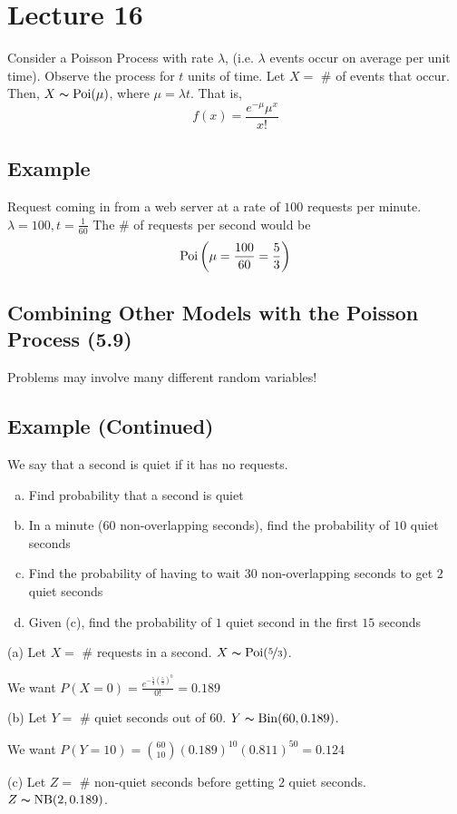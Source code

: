 \section{Lecture 16}
Consider a Poisson Process with rate $ \lambda $, (i.e. $ \lambda $ events
occur on average per unit time). Observe the process for $ t $ units of time.
Let $ X= $ \# of events that occur. Then, $ X \thicksim \operatorname{Poi}(\mu) $, where
$ \mu=\lambda t $. That is,
\[ f(x)=\frac{e^{-\mu}\mu^x}{x!} \]

\subsection{Example}
Request coming in from a web server at a rate of $ 100 $ requests per minute.
$ \lambda = 100, t=\frac{1}{60} $
The \# of requests per second would be
\[ \operatorname{Poi}\left(\mu=\frac{100}{60}=\frac{5}{3}\right) \]

\subsection{Combining Other Models with the Poisson Process (5.9)}
Problems may involve many different random variables!

\subsection{Example (Continued)}
We say that a second is quiet if it has no requests.
\begin{enumerate}[(a)]
    \item Find probability that a second is quiet
    \item In a minute ($60$ non-overlapping seconds), find the probability of $10$ quiet seconds
    \item Find the probability of having to wait $ 30 $ non-overlapping seconds to get $ 2 $ quiet seconds
    \item Given (c), find the probability of $ 1 $ quiet second in the first $ 15 $ seconds
\end{enumerate}
(a) Let $ X= $ \# requests in a second. $ X \thicksim \operatorname{Poi}(\nicefrac{5}{3}) $.

We want $ P(X=0)=\frac{e^{-\frac{5}{3}(\frac{5}{3})^0}}{0!}=0.189 $


(b) Let $ Y= $ \# quiet seconds out of 60. $ Y \thicksim \operatorname{Bin}(60,0.189) $.

We want $ P(Y=10)=\binom{60}{10}(0.189)^{10}(0.811)^{50}=0.124 $

(c) Let $ Z= $ \# non-quiet seconds before getting $ 2 $ quiet seconds. 
$ Z \thicksim \operatorname{NB}(2,0.189) $.

